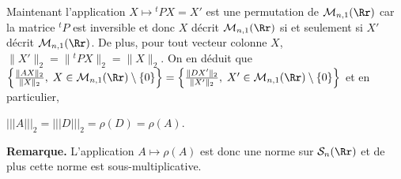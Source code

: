 {{Maintenant l'application $X\mapsto{^t}PX=X'$ est une permutation de $\mathcal{M}_{n,1}(\Rr)$ car la matrice ${^t}P$ est inversible et donc $X$ décrit $\mathcal{M}_{n,1}(\Rr)$ si et seulement si $X'$ décrit $\mathcal{M}_{n,1}(\Rr)$. De plus, pour tout vecteur colonne $X$, $\|X'\|_2=\|{^t}PX\|_2=\|X\|_2$. On en déduit que $\left\{
 \frac{\|AX\|_2}{\|X\|_2},\;X\in\mathcal{M}_{n,1}(\Rr)\setminus\{0\}\right\}=\left\{
 \frac{\|DX'\|_2}{\|X'\|_2},\;X'\in\mathcal{M}_{n,1}(\Rr)\setminus\{0\}\right\}$ et en particulier,

\begin{center}
$|||A|||_2=|||D|||_2=\rho(D)=\rho(A)$.
\end{center}

\begin{center}
\end{center}

\textbf{Remarque.} L'application $A\mapsto\rho(A)$ est donc une norme sur $\mathcal{S}_n(\Rr)$ et de plus cette norme est sous-multiplicative.}
}